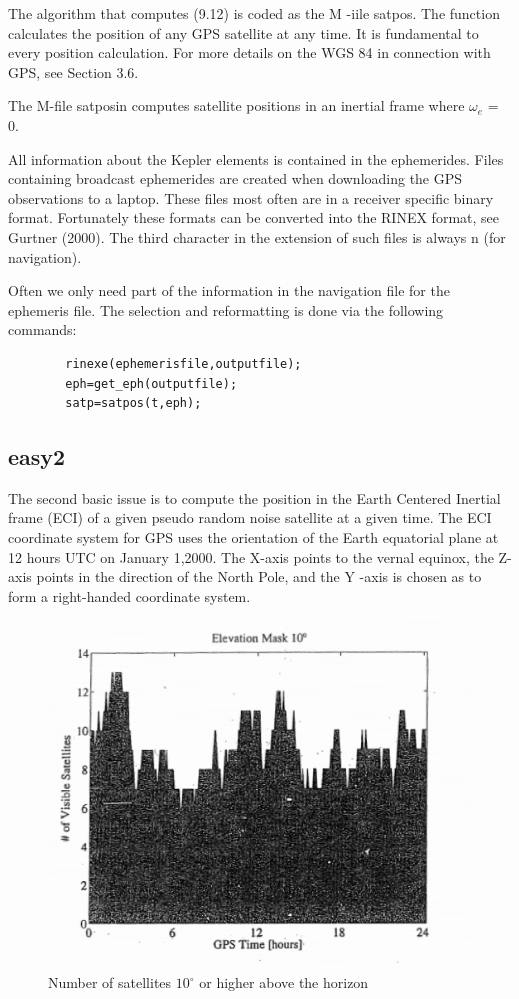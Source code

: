 	The algorithm that computes (9.12) is coded as the M -iile satpos. The function calculates the position of any GPS satellite at any time. It is fundamental to every position calculation. For more details on the WGS 84 in connection with GPS, see Section 3.6.
		
	The M-file satposin computes satellite positions in an inertial frame where $\omega_e$ = 0.
		
	All information about the Kepler elements is contained in the ephemerides. Files containing broadcast ephemerides are created when downloading the GPS observations to a laptop. These files most often are in a receiver specific binary format. Fortunately these formats can be converted into the RINEX format, see Gurtner (2000). The third character in the extension of such files is always n (for navigation).
		
	Often we only need part of the information in the navigation file for the ephemeris file. The selection and reformatting is done via the following commands:
	\begin{lstlisting}
		rinexe(ephemerisfile,outputfile);
		eph=get_eph(outputfile);
		satp=satpos(t,eph);
	\end{lstlisting}
	\subsection{easy2}\label{subsec:easy2}
		The second basic issue is to compute the position in the Earth Centered Inertial frame (ECI) of a given pseudo random noise satellite at a given time. The ECI coordinate system for GPS uses the orientation of the Earth equatorial plane at 12 hours UTC on January 1,2000. The X-axis points to the vernal equinox, the Z-axis points in the direction of the North Pole, and the Y -axis is chosen as to form a right-handed coordinate system.
		\begin{figure}
			\centering
			\includegraphics[width=0.7\linewidth]{TeX_files/Part03/chapter09/image/9-10}
			\caption{Number of satellites $10^\circ$ or higher above the horizon}
			\label{fig:9-10}
		\end{figure}
	
